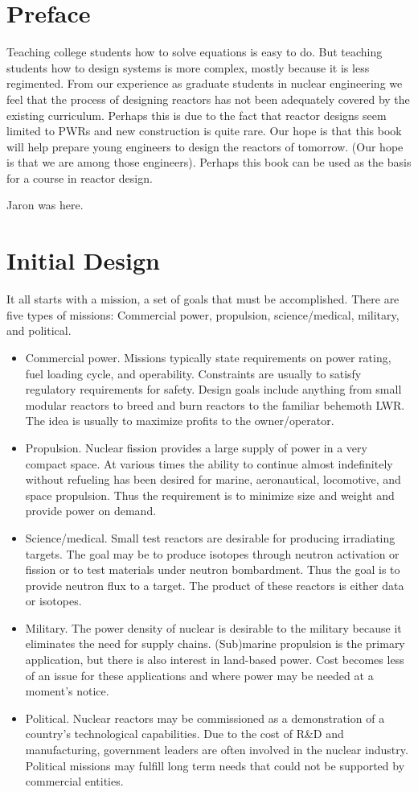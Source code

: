 \documentclass[]{article}
\begin{document}
\section{Preface}
Teaching college students how to solve equations is easy to do. But teaching students how to design systems is more complex, mostly because it is less regimented. From our experience as graduate students in nuclear engineering we feel that the process of designing reactors has not been adequately covered by the existing curriculum. Perhaps this is due to the fact that reactor designs seem limited to PWRs and new construction is quite rare. Our hope is that this book will help prepare young engineers to design the reactors of tomorrow. (Our hope is that we are among those engineers). Perhaps this book can be used as the basis for a course in reactor design.

Jaron was here.

\section{Initial Design}
It all starts with a mission, a set of goals that must be accomplished. There are five types of missions: Commercial power, propulsion, science/medical, military, and political.
\begin{itemize}
  \item Commercial power. Missions typically state requirements on power rating, fuel loading cycle, and operability. Constraints are usually to satisfy regulatory requirements for safety. Design goals include anything from small modular reactors to breed and burn reactors to the familiar behemoth LWR. The idea is usually to maximize profits to the owner/operator.
  \item Propulsion. Nuclear fission provides a large supply of power in a very compact space. At various times the ability to continue almost indefinitely without refueling has been desired for marine, aeronautical, locomotive, and space propulsion. Thus the requirement is to minimize size and weight and provide power on demand.
  \item Science/medical. Small test reactors are desirable for producing irradiating targets. The goal may be to produce isotopes through neutron activation or fission or to test materials under neutron bombardment. Thus the goal is to provide neutron flux to a target. The product of these reactors is either data or isotopes. 
  \item Military. The power density of nuclear is desirable to the military because it eliminates the need for supply chains. (Sub)marine propulsion is the primary application, but there is also interest in land-based power. Cost becomes less of an issue for these applications and where power may be needed at a moment's notice.
  \item Political. Nuclear reactors may be commissioned as a demonstration of a country's technological capabilities. Due to the cost of R\&D and manufacturing, government leaders are often involved in the nuclear industry. Political missions may fulfill long term needs that could not be supported by commercial entities.
\end{itemize}
\end{document}
